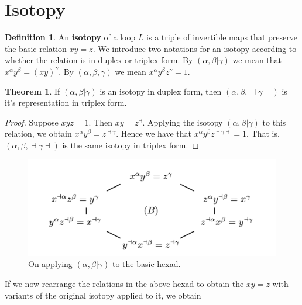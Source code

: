 \documentclass[11pt]{report}
\theoremstyle{plain}
\theoremstyle{definition}
\newtheorem{defn}{Definition}
\newtheorem{theorem}{Theorem}
\begin{document}
\section{Isotopy}
\begin{defn}
	An \textbf{isotopy} of a loop $ L $ is a triple of invertible maps that preserve the basic relation $ xy=z $. We introduce two notations for an isotopy according to whether the relation is in duplex or triplex form. By $ (\alpha , \beta | \gamma) $ we mean that $ x^\alpha y^\beta = (xy)^\gamma $. By $ (\alpha ,\beta ,\gamma) $ we mean $ x^\alpha y^\beta z^\gamma = 1.$
\end{defn}
\begin{theorem}
	If $ (\alpha , \beta | \gamma) $ is an isotopy in duplex form, then $ (\alpha ,\beta ,\dashv \gamma \dashv) $ is it's representation in triplex form.
\end{theorem}
\begin{proof}
Suppose $ xyz = 1 $. Then $ xy = z^\dashv$. Applying the isotopy $ (\alpha , \beta | \gamma) $ to this relation, we obtain $ x^{\alpha} y^{\beta} = z^{\dashv\gamma} $. Hence we have that $ x^{\alpha} y^{\beta} z^{\dashv\gamma\dashv} = 1 $. That is, $ (\alpha ,\beta ,\dashv \gamma \dashv) $ is the same isotopy in triplex form.
\end{proof}
\begin{figure}[h]
	\includegraphics[scale = 0.9]{onqando2}
	\centering
	\caption{On applying $ (\alpha, \beta | \gamma )$ to the basic hexad.}
\end{figure}
If we now rearrange the relations in the above hexad to obtain the $ xy=z $ with variants of the original isotopy applied to it, we obtain
\end{document}

